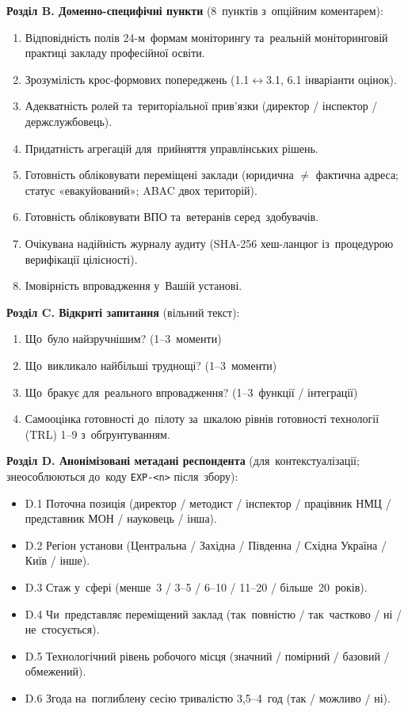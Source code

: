 \textbf{Розділ B. Доменно-специфічні пункти} (8~пунктів з~опційним коментарем):

\begin{enumerate}[noitemsep,topsep=2pt,leftmargin=*]
    \item[B.1] Відповідність полів 24-м~формам моніторингу та~реальній моніторинговій практиці закладу професійної освіти.
    \item[B.2] Зрозумілість крос-формових попереджень (1.1$\leftrightarrow$3.1, 6.1 інваріанти оцінок).
    \item[B.3] Адекватність ролей та~територіальної прив'язки (директор / інспектор / держслужбовець).
    \item[B.4] Придатність агрегацій для~прийняття управлінських рішень.
    \item[B.5] Готовність обліковувати переміщені заклади (юридична $\neq$ фактична адреса; статус «евакуйований»; ABAC двох територій).
    \item[B.6] Готовність обліковувати ВПО та~ветеранів серед~здобувачів.
    \item[B.7] Очікувана надійність журналу аудиту (SHA-256 хеш-ланцюг із~процедурою верифікації цілісності).
    \item[B.8] Імовірність впровадження у~Вашій установі.
\end{enumerate}

\textbf{Розділ C. Відкриті запитання} (вільний текст):

\begin{enumerate}[noitemsep,topsep=2pt,leftmargin=*]
    \item[C.1] Що~було найзручнішим? (1--3~моменти)
    \item[C.2] Що~викликало найбільші труднощі? (1--3~моменти)
    \item[C.3] Що~бракує для~реального впровадження? (1--3~функції / інтеграції)
    \item[C.4] Самооцінка готовності до~пілоту за~шкалою рівнів готовності технології (TRL) 1--9 з~обґрунтуванням.
\end{enumerate}

\textbf{Розділ D. Анонімізовані метадані респондента} (для~контекстуалізації; знеособлюються до~коду \texttt{EXP-<n>} після~збору):

\begin{itemize}[noitemsep,topsep=2pt,leftmargin=*]
    \item D.1 Поточна позиція (директор / методист / інспектор / працівник НМЦ / представник МОН / науковець / інша).
    \item D.2 Регіон установи (Центральна / Західна / Південна / Східна Україна / Київ / інше).
    \item D.3 Стаж у~сфері (менше~3 / 3--5 / 6--10 / 11--20 / більше~20~років).
    \item D.4 Чи~представляє переміщений заклад (так~повністю / так~частково / ні / не~стосується).
    \item D.5 Технологічний рівень робочого місця (значний / помірний / базовий / обмежений).
    \item D.6 Згода на~поглиблену сесію тривалістю 3,5--4~год (так / можливо / ні).
\end{itemize}

